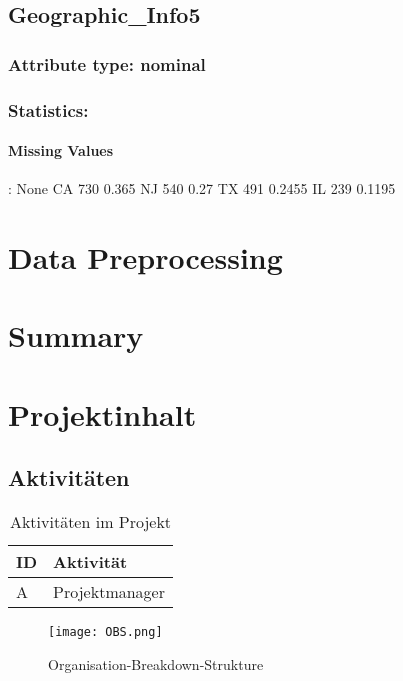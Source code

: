 \subsection{Geographic\_Info5}
\subsubsection{Attribute type: nominal}
\subsubsection{Statistics: }
\paragraph{Missing Values}: None
CA	730	0.365
NJ	540	0.27
TX	491	0.2455
IL	239	0.1195

\section{Data Preprocessing}

\section{Summary}


\section{Projektinhalt}
\subsection{Aktivitäten}
\begin{table}[H]
    \renewcommand{\arraystretch}{1.05}
    \begin{center}
        \begin{tabular}{l|l}
            \hline
            \textbf{ID} & \textbf{Aktivität}\\\hline
            A    & Projektmanager\\ \hline
        \end{tabular}
        \caption{Aktivitäten im Projekt}
    \end{center}
\end{table}

\begin{figure}[H]
    \begin{center}
        \texttt{[image: OBS.png]}
    \end{center}
    \caption{Organisation-Breakdown-Strukture}
\end{figure}






